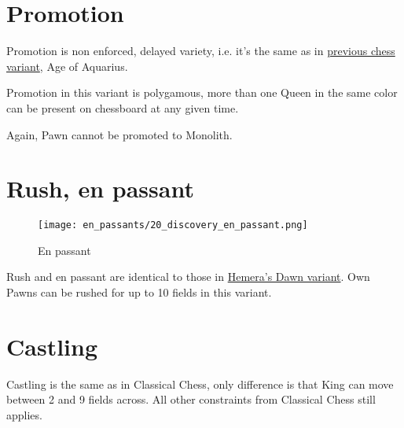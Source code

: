 \clearpage %

\section*{Promotion}

Promotion is non enforced, delayed variety, i.e. it's the same as in
\hyperref[sec:Age of Aquarius/Promotion]{previous chess variant}, Age of Aquarius.

Promotion in this variant is polygamous, more than one Queen in the same color
can be present on chessboard at any given time.

Again, Pawn cannot be promoted to Monolith.

\clearpage %

\section*{Rush, en passant}

\vspace*{-1.2\baselineskip}
\noindent
\begin{figure}[!h]
\texttt{[image: en\_passants/20\_discovery\_en\_passant.png]}
\caption{En passant}
\label{fig:20_discovery_en_passant}
\end{figure}

Rush and en passant are identical to those in \hyperref[fig:14_hemera_s_dawn_en_passant]{Hemera's Dawn variant}.
Own Pawns can be rushed for up to 10 fields in this variant.

\clearpage %

\section*{Castling}

Castling is the same as in Classical Chess, only difference is that King can move between 2 and 9 fields across.
All other constraints from Classical Chess still applies.

